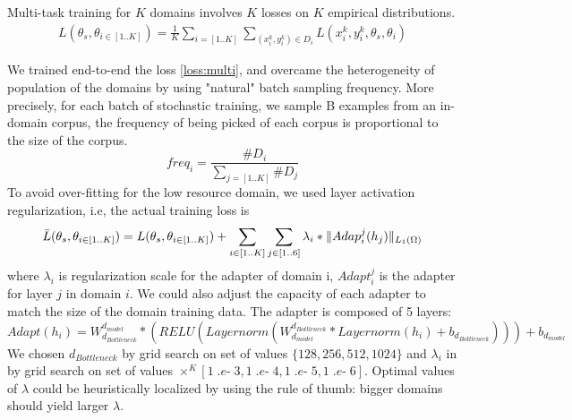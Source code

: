 \documentclass[12pt,a4paper,twoside]{report}
\theoremstyle{definition}
\newcommand\minus{\mathop{\mbox{$\mathit{.e}$-}}}
\begin{document}
Multi-task training for $K$ domains involves $K$ losses on $K$ empirical distributions. 
\begin{equation}
\begin{split}
L(\theta_{s},\theta_{i \in [1..K]}) = \frac{1}{K} \displaystyle{\mathop{\sum}_{i=[1..K]} \mathop{\sum}_{(x_i^{k},y_i^{k}) \in D_i}L(x_i^{k},y_i^{k},\theta_s,\theta_i)}
\end{split}
\label{loss:multi}
\end{equation}

We trained end-to-end the loss \ref{loss:multi}, and overcame the heterogeneity of population of the domains by using "natural" batch sampling frequency. More precisely, for each batch of stochastic training, we sample B examples from an in-domain corpus, the frequency of being picked of each corpus is proportional to the size of the corpus.
$$freq_i = \frac{\#D_i}{\displaystyle{\mathop{\sum}_{j=[1..K]}\#D_j}}$$
To avoid over-fitting for the low resource domain, we used layer activation regularization, i.e, the actual training loss is 
\begin{equation}
\begin{split}
\bar{L}(\theta_{s},\theta_{i \in [1..K]}) = L(\theta_{s},\theta_{i \in [1..K]}) + \displaystyle{\mathop{\sum}_{i \in [1..K]} \mathop{\sum}_{j \in [1..6]} \lambda_i * \normL{Adap^{j}_i(h_j)}}
\end{split}
\label{loss:multi-reg}
\end{equation}
where $\lambda_i$ is regularization scale for the adapter of domain i, $Adapt^j_i$ is the adapter for layer $j$ in domain $i$. We could also adjust the capacity of each adapter to match the size of the domain training data. The adapter is composed of 5 layers:
$$Adapt(h_i) = W^{d_{model}}_{d_{Bottleneck}} * (RELU( Layernorm ( W^{d_{Bottleneck}}_{d_{model}} * Layernorm(h_i) + b_{d_{Bottleneck}} ) )) + b_{d_{model}}$$
We chosen $d_{Bottleneck}$ by grid search on set of values $\{128, 256,512,1024\}$ and $\lambda_i$ in by grid search on set of values $\times^{K}[1\minus{3}, 1\minus{4},1\minus{5},1\minus{6}]$. Optimal values of $\lambda$ could be heuristically localized by using the rule of thumb: bigger domains should yield larger $\lambda$.
\end{document}
